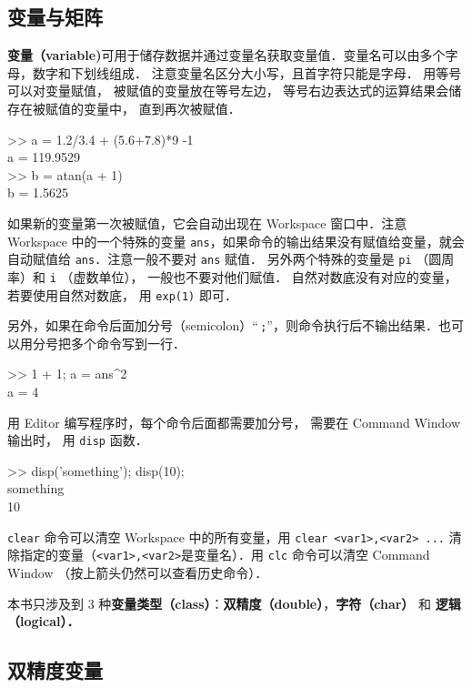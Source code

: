 

\subsection{变量与矩阵}
\textbf{变量（variable)}可用于储存数据并通过变量名获取变量值．变量名可以由多个字母，数字和下划线组成． 注意变量名区分大小写，且首字符只能是字母． 用等号可以对变量赋值， 被赋值的变量放在等号左边， 等号右边表达式的运算结果会储存在被赋值的变量中， 直到再次被赋值．
\begin{Command}
>> a = 1.2/3.4 + (5.6+7.8)*9 -1 \\
a = 119.9529 \\
>> b = atan(a + 1) \\
b = 1.5625
\end{Command}
如果新的变量第一次被赋值，它会自动出现在 Workspace 窗口中．注意 Workspace 中的一个特殊的变量 \texttt{ans}，如果命令的输出结果没有赋值给变量，就会自动赋值给 \texttt{ans}．注意一般不要对 \texttt{ans} 赋值． 另外两个特殊的变量是 \texttt{pi} （圆周率）和 \texttt{i} （虚数单位）， 一般也不要对他们赋值． 自然对数底没有对应的变量， 若要使用自然对数底， 用 \texttt{exp(1)} 即可．

另外，如果在命令后面加分号（semicolon）“\,\texttt{;}”，则命令执行后不输出结果．也可以用分号把多个命令写到一行．
\begin{Command}
>> 1 + 1; a = ans\^{}2 \\
a = 4
\end{Command}
用 Editor 编写程序时，每个命令后面都需要加分号， 需要在 Command Window 输出时， 用 \texttt{disp} 函数．
\begin{Command}
>> disp({\color{string}'something'}); disp(10);\\
something\\
10
\end{Command}

\texttt{clear} 命令可以清空 Workspace 中的所有变量，用 \texttt{clear <var1>,<var2> ...} 清除指定的变量（\texttt{<var1>,<var2>}是变量名）．用 \texttt{clc} 命令可以清空 Command Window （按上箭头仍然可以查看历史命令）．

本书只涉及到 3 种\textbf{变量类型（class）}：\textbf{双精度（double）}，\textbf{字符（char）} 和 \textbf{逻辑（logical）．}

\subsection{双精度变量}

